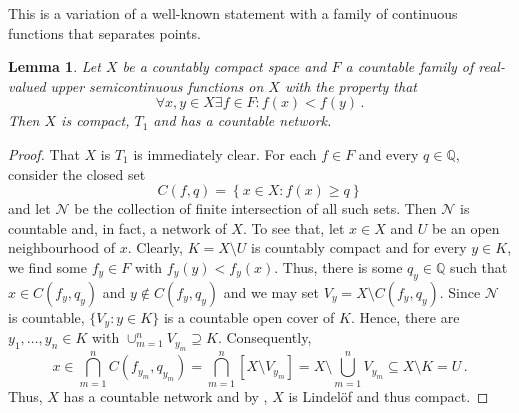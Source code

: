 \documentclass[
	paper=A4,
	pagesize=auto,
	fontsize=12pt
]{scrartcl}
\theoremstyle{plain}
\newtheorem{lemma}[theorem]{Lemma}
\theoremstyle{remark}
\theoremstyle{definition}
\begin{document}
%
This is a variation of a well-known statement with a family of continuous functions that separates points.
%
\begin{lemma}
\label{lem:USCSeparation}
Let $X$ be a countably compact space and $F$ a countable family of real-valued upper semicontinuous functions on $X$ with the property that
%
\begin{equation}
\forall x, y \in X \exists f \in F : f \left( x \right) < f \left( y \right) \, .
\end{equation}
%
Then $X$ is compact, $T_1$ and has a countable network.
\end{lemma}
\begin{proof}
That $X$ is $T_1$ is immediately clear.
For each $f \in F$ and every $q \in \mathbb{Q}$, consider the closed set
%
\begin{equation}
C \left( f, q \right) = \left\{ x \in X : f \left( x \right) \ge q \right\}
\end{equation}
%
and let $\mathcal{N}$ be the collection of finite intersection of all such sets.
Then $\mathcal{N}$ is countable and, in fact, a network of $X$.
To see that, let $x \in X$ and $U$ be an open neighbourhood of $x$.
Clearly, $K = X \setminus U$ is countably compact and for every $y \in K$, we find some $f_y \in F$ with $f_y(y) < f_y(x)$.
Thus, there is some $q_y \in \mathbb{Q}$ such that $x \in C ( f_y, q_y )$ and $y \notin C ( f_y, q_y )$ and we may set $V_y = X \setminus C ( f_y, q_y )$.
Since $\mathcal{N}$ is countable, $\{V_y : y \in K \}$ is a countable open cover of $K$.
Hence, there are $y_1, \dots, y_n \in K$ with $\cup_{m = 1}^n V_{y_m} \supseteq K$.
Consequently,
%
\begin{equation}
x
\in
\bigcap_{m = 1}^n C ( f_{y_m}, q_{y_m} )
=
\bigcap_{m = 1}^n \left[ X \setminus V_{y_m} \right]
=
X \setminus \bigcup_{m = 1}^n V_{y_m}
\subseteq
X \setminus K
=
U \, .
\end{equation}
%
Thus, $X$ has a countable network and by , $X$ is Lindelöf and thus compact.
\end{proof}
%
\end{document}
